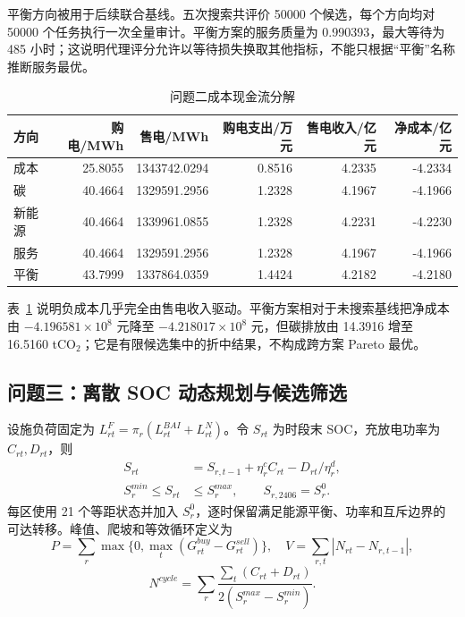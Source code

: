 平衡方向被用于后续联合基线。五次搜索共评价 50000 个候选，每个方向均对 50000 个任务执行一次全量审计。平衡方案的服务质量为 0.990393，最大等待为 485 小时；这说明代理评分允许以等待损失换取其他指标，不能只根据“平衡”名称推断服务最优。

\begin{table}[H]\centering\small
\caption{问题二成本现金流分解}\label{tab:q2cost}
\begin{tabular}{lrrrrr}\toprule
方向 & 购电/MWh & 售电/MWh & 购电支出/万元 & 售电收入/亿元 & 净成本/亿元\\\midrule
成本 & 25.8055 & 1343742.0294 & 0.8516 & 4.2335 & -4.2334\\
碳 & 40.4664 & 1329591.2956 & 1.2328 & 4.1967 & -4.1966\\
新能源 & 40.4664 & 1339961.0855 & 1.2328 & 4.2231 & -4.2230\\
服务 & 40.4664 & 1329591.2956 & 1.2328 & 4.1967 & -4.1966\\
平衡 & 43.7999 & 1337864.0359 & 1.4424 & 4.2182 & -4.2180\\\bottomrule
\end{tabular}
\end{table}

表~\ref{tab:q2cost} 说明负成本几乎完全由售电收入驱动。平衡方案相对于未搜索基线把净成本由 $-4.196581\times10^8$ 元降至 $-4.218017\times10^8$ 元，但碳排放由 14.3916 增至 16.5160 tCO$_2$；它是有限候选集中的折中结果，不构成跨方案 Pareto 最优。

\subsection{问题三：离散 SOC 动态规划与候选筛选}
设施负荷固定为 $L^F_{rt}=\pi_r(L^{BAI}_{rt}+L^N_{rt})$。令 $S_{rt}$ 为时段末 SOC，充放电功率为 $C_{rt},D_{rt}$，则
\begin{align}
S_{rt}&=S_{r,t-1}+\eta_r^cC_{rt}-D_{rt}/\eta_r^d,\\
S_r^{min}\le S_{rt}&\le S_r^{max},\qquad S_{r,2406}=S_r^0.
\end{align}
每区使用 21 个等距状态并加入 $S_r^0$，逐时保留满足能源平衡、功率和互斥边界的可达转移。峰值、爬坡和等效循环定义为
\begin{equation}
P=\sum_r\max\{0,\max_t(G^{buy}_{rt}-G^{sell}_{rt})\},\quad
V=\sum_{r,t}|N_{rt}-N_{r,t-1}|,
\end{equation}
\begin{equation}
N^{cycle}=\sum_r\frac{\sum_t(C_{rt}+D_{rt})}{2(S_r^{max}-S_r^{min})}.
\end{equation}

